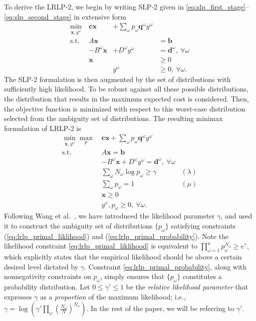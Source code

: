 \documentclass[11pt]{article}
\newcommand{\x}{\mathbf{x}}
\renewcommand{\c}{\mathbf{c}}
\newcommand{\q}{\mathbf{q}}
\renewcommand{\b}{\mathbf{b}}
\renewcommand{\d}{\mathbf{d}}
\newcommand{\st}{\mbox{s.t.}}
\begin{document}
To derive the LRLP-2, we begin by writing SLP-2 given in \eqref{eq:slp_first_stage}--\eqref{eq:slp_second_stage} in extensive form
\[
	\begin{array}{rrrl}
		\min_{\x,y^\omega} \ & \c\x & + \sum_\omega p_\omega \q^\omega y^\omega \label{eq:slp2cost} \\
		\st \ & A\x & & = \b \nonumber \\
		& -B^\omega \x & + D^\omega y^\omega & = \d^\omega,\ \forall \omega \nonumber \\
		& \x & & \geq 0 \nonumber \\
		& & y^\omega & \geq 0,\ \forall \omega. \nonumber
	\end{array}
\]
The SLP-2 formulation is then augmented by the set of distributions with sufficiently high likelihood. 
To be robust against all these possible distributions, the distribution that results in the maximum expected cost is considered. 
Then, the objective function is minimized with respect to this worst-case distribution selected from the ambiguity set of distributions.
The resulting minimax formulation of LRLP-2 is
\begin{align}
	\min_{\x,y^\omega} \max_p \ & \c\x + \sum_\omega p_\omega \q^\omega y^\omega \label{eq:lrlp_primal}\\
	\st \ & A\x = \b \nonumber \\
	& -B^\omega \x + D^\omega y^\omega = \d^\omega,\ \forall \omega \nonumber \\
	& \sum_\omega N_\omega \log p_\omega \geq \gamma & (\lambda) \label{eq:lrlp_primal_liklihood} \\
	& \sum_\omega p_\omega = 1 & (\mu) \label{eq:lrlp_primal_probability} \\
	& \x \geq 0 \nonumber \\
	& y^\omega, p_\omega \geq 0,\ \forall \omega. \nonumber
\end{align}
Following Wang et al.\ \cite{wang2010likelihood}, we have introduced the likelihood parameter $\gamma$, and used it to construct the ambiguity set of distributions $\{p_\omega\}$ satisfying constraints (\ref{eq:lrlp_primal_liklihood}) and (\ref{eq:lrlp_primal_probability}).
Note the likelihood constraint \eqref{eq:lrlp_primal_liklihood} is equivalent to $\prod_{\omega=1}^n p_\omega^{N_\omega} \geq e^\gamma$, which explicitly states that the empirical likelihood should be above a certain desired level dictated by $\gamma$. 
Constraint \eqref{eq:lrlp_primal_probability}, along with nonnegativity constraints on $p_\omega$, simply ensures that $\{p_\omega\}$ constitutes a probability distribution. 
Let $0 \leq \gamma' \leq 1$ be the \emph{relative likelihood parameter} that expresses $\gamma$ as a {\it proportion} of the maximum likelihood; i.e., $\gamma = \log( \gamma' \prod_\omega (\tfrac{N_\omega}{N})^{N_\omega})$.
In the rest of the paper, we will be referring to $\gamma'$. 
\end{document}
